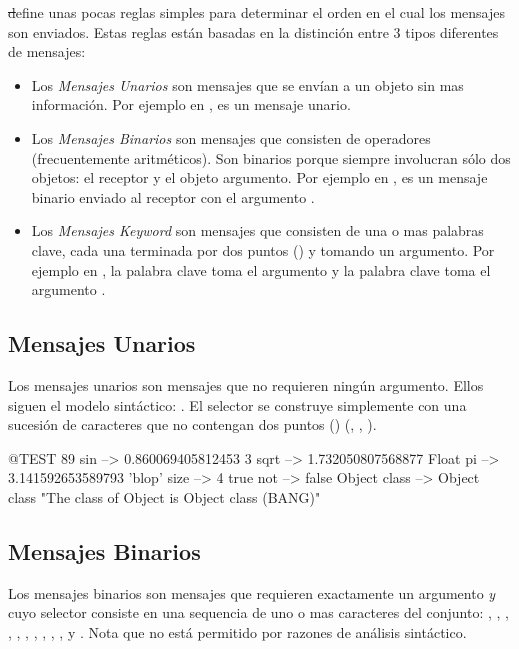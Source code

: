\documentclass[a4paper,10pt,twoside]{book}
\begin{document}
\st define unas pocas reglas simples para determinar el orden en el cual los mensajes son enviados. Estas reglas est\'an basadas en la distinci\'on entre 3 tipos diferentes de mensajes: 
\begin{itemize}
\item Los \emph{Mensajes Unarios} son mensajes que se env\'ian a un objeto sin mas informaci\'on. Por ejemplo en ,  es un mensaje unario. 
\item Los \emph{Mensajes Binarios} son mensajes que consisten de operadores (frecuentemente aritm\'eticos). Son binarios porque siempre involucran s\'olo dos objetos: el receptor y el objeto argumento. Por ejemplo en , \ct{+} es un mensaje binario enviado al receptor  con el argumento . 
\item Los \emph{Mensajes Keyword} son mensajes que consisten de una o mas palabras clave, cada una terminada por dos puntos (\ct{:}) y tomando un argumento. Por ejemplo en , la palabra clave  toma el argumento  y la palabra clave  toma el argumento .
\end{itemize}

\subsection{Mensajes Unarios}
Los mensajes unarios son mensajes que no requieren ning\'un argumento. Ellos siguen el modelo sint\'actico: . El selector se construye simplemente con una sucesi\'on de caracteres que no contengan dos puntos (\ct{:}) (\eg {}, , ).
\begin{code}{@TEST}
89 sin           --> 0.860069405812453
3 sqrt           --> 1.732050807568877
Float pi         --> 3.141592653589793
'blop' size     --> 4
true not        --> false
Object class --> Object class  "The class of Object is Object class (BANG)"
\end{code}


\subsection{Mensajes Binarios} 
Los mensajes binarios son mensajes que requieren exactamente un argumento \emph{y} cuyo selector consiste en una sequencia de uno o mas caracteres del conjunto: \ct{+}, \ct{-}, \ct{*}, \ct{/}, \ct{&}, \ct{=}, \ct{>}, \ct{|}, \ct{<}, \ct{~}, y . Nota que \ct{--} no est\'a permitido por razones de an\'alisis sint\'actico.
\end{document}
